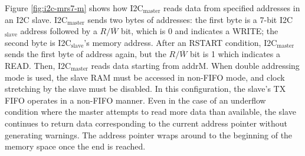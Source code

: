 \documentclass[main\_\_EN.tex]{subfiles}
\begin{document}
Figure \ref{fig:i2c-mrs7-m} shows how I2C$_\text{master}$ reads data from specified addresses in an I2C slave. I2C$_\text{master}$ sends two bytes of addresses: the first byte is a 7-bit I2C$_\text{slave}$ address followed by a $R/\overline W$ bit, which is 0 and indicates a WRITE; the second byte is I2C$_\text{slave}$'s memory address. After an RSTART condition, I2C$_\text{master}$ sends the first byte of address again, but the $R/\overline W$ bit is 1 which indicates a READ. Then, I2C$_\text{master}$ reads data starting from addrM. When double addressing mode is used, the slave RAM must be accessed in non-FIFO mode, and clock stretching by the slave must be disabled. In this configuration, the slave's TX FIFO operates in a non-FIFO manner. Even in the case of an underflow condition where the master attempts to read more data than available, the slave continues to return data corresponding to the current address pointer without generating warnings. The address pointer wraps around to the beginning of the memory space once the end is reached.
\end{document}
